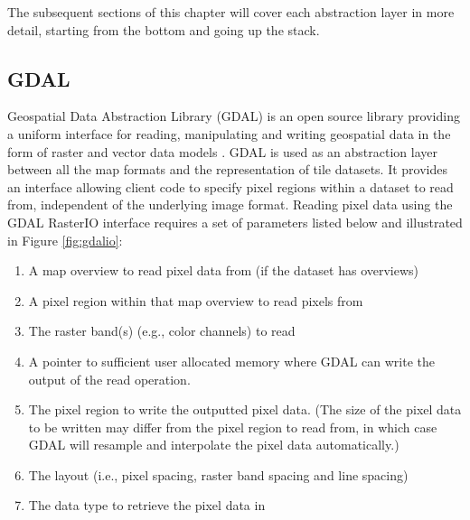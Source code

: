 \begin{center}
  \begin{table}
  \caption[]{Abstraction layers used in the texture data pipeline}
    \label{table:tilepipeline}
  \end{table}
\end{center}

The subsequent sections of this chapter will cover each abstraction layer in more detail, starting from the bottom and going up the stack.

\subsection{GDAL}
Geospatial Data Abstraction Library (GDAL) is an open source library providing a uniform interface for reading, manipulating and writing geospatial data in the form of raster and vector data models \cite{gdal}. GDAL is used as an abstraction layer between all the map formats and the representation of tile datasets. It provides an interface allowing client code to specify pixel regions within a dataset to read from, independent of the underlying image format. Reading pixel data using the GDAL RasterIO interface requires a set of parameters listed below and illustrated in Figure \ref{fig:gdalio}:

\begin{enumerate}
	\item A map overview to read pixel data from (if the dataset has overviews)
	\item A pixel region within that map overview to read pixels from
	\item The raster band(s) (e.g., color channels) to read
	\item A pointer to sufficient user allocated memory where GDAL can write the output of the read operation. 
	\item The pixel region to write the outputted pixel data. (The size of the pixel data to be written may differ from the pixel region to read from, in which case GDAL will resample and interpolate the pixel data automatically.)
	\item The layout (i.e., pixel spacing, raster band spacing and line spacing)
	\item The data type to retrieve the pixel data in
\end{enumerate}

